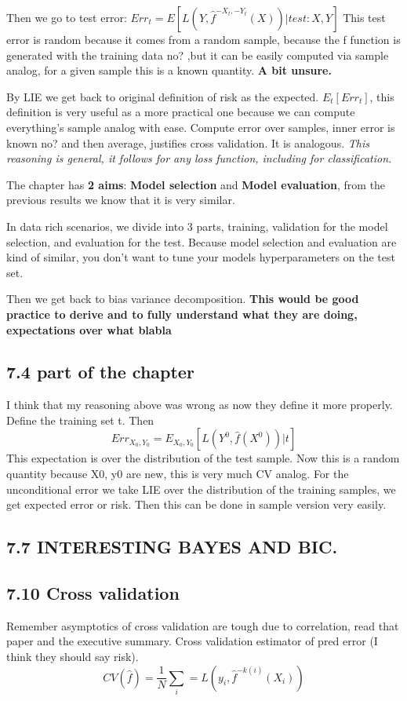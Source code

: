 \documentclass{article}
\begin{document}
Then we go to test error: $Err_t= E[L(Y,\hat{f}^{-X_t,-Y_t}(X))|test: X,Y]$
This test error is random because it comes from a random sample, because the f function is generated with the training data no? ,but it can be easily computed via sample analog, for a given sample this is a known quantity. \textbf{A bit unsure.}

By LIE we get back to original definition of risk as the expected. $E_t[Err_t]$, this definition is very useful as a more practical one because we can compute everything's sample analog with ease. Compute error over samples, inner error is known no? and then average, justifies cross validation. It is analogous.
\textit{This reasoning is general, it follows for any loss function, including for classification.}

The chapter has \textbf{2 aims}: \textbf{Model selection} and \textbf{Model evaluation}, from the previous results we know that it is very similar.

In data rich scenarios, we divide into 3 parts, training, validation for the model selection, and evaluation for the test. Because model selection and evaluation are kind of similar, you don't want to tune your models hyperparameters on the test set.

Then we get back to bias variance decomposition. 
\textbf{This would be good practice to derive and to fully understand what they are doing, expectations over what blabla}

\subsection{7.4 part of the chapter}

I think that my reasoning above was wrong as now they define it more properly.
Define the training set t.
Then $$Err_{X_0,Y_0}= E_{X_0,Y_0}[L(Y^0,\hat{f}(X^0))|t]$$
This expectation is over the distribution of the test sample. Now this is a random quantity because X0, y0 are new, this is very much CV analog.
For the unconditional error we take LIE over the distribution of the training samples, we get expected error or risk. Then this can be done in sample version very easily.
\subsection{7.7 INTERESTING BAYES AND BIC.}


\subsection{7.10 Cross validation}
Remember asymptotics of cross validation are tough due to correlation, read that paper and the executive summary.
Cross validation estimator of pred error (I think they should say risk). $$CV(\hat{f})=\frac{1}{N}\sum_i=L(y_i,\hat{f}^{-k(i)}(X_i))$$
\end{document}
